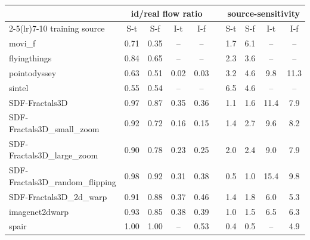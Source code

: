 \begin{tabular}{l cccc c cccc}
\toprule
 & \multicolumn{4}{c}{id/real flow ratio} & & \multicolumn{4}{c}{source-sensitivity} \\
\cmidrule(lr){2-5}\cmidrule(lr){7-10}
training source & S-t & S-f & I-t & I-f & & S-t & S-f & I-t & I-f \\
\midrule
movi\_f                    & 0.71 & 0.35 & --   & --   & & 1.7 & 6.1 & --   & --   \\
flyingthings               & 0.84 & 0.65 & --   & --   & & 2.3 & 3.6 & --   & --   \\
pointodyssey               & 0.63 & 0.51 & 0.02 & 0.03 & & 3.2 & 4.6 & 9.8  & 11.3 \\
sintel                     & 0.55 & 0.54 & --   & --   & & 6.5 & 4.6 & --   & --   \\
SDF-Fractals3D                  & 0.97 & 0.87 & 0.35 & 0.36 & & 1.1 & 1.6 & 11.4 & 7.9  \\
SDF-Fractals3D\_small\_zoom     & 0.92 & 0.72 & 0.16 & 0.15 & & 1.4 & 2.7 & 9.6  & 8.2  \\
SDF-Fractals3D\_large\_zoom     & 0.90 & 0.78 & 0.23 & 0.25 & & 2.0 & 2.4 & 9.0  & 7.9  \\
SDF-Fractals3D\_random\_flipping& 0.98 & 0.92 & 0.31 & 0.38 & & 0.5 & 1.0 & 15.4 & 9.8  \\
SDF-Fractals3D\_2d\_warp        & 0.91 & 0.88 & 0.37 & 0.46 & & 1.4 & 1.8 & 6.0  & 5.3  \\
imagenet2dwarp             & 0.93 & 0.85 & 0.38 & 0.39 & & 1.0 & 1.5 & 6.5  & 6.3  \\
spair                      & 1.00 & 1.00 & --   & 0.53 & & 0.4 & 0.5 & --   & 4.9  \\
\bottomrule
\end{tabular}
